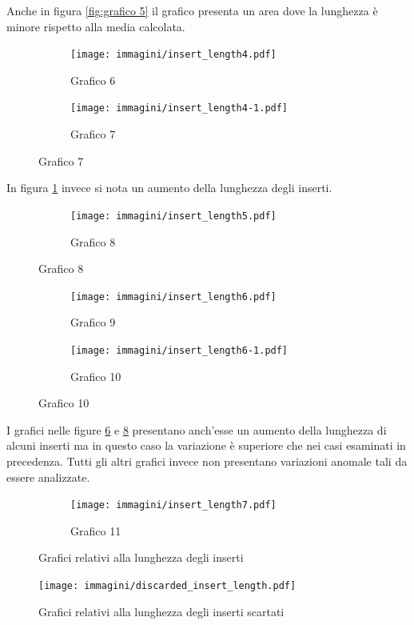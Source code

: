 Anche in figura \ref{fig:grafico 5} il grafico presenta un area dove la lunghezza è minore rispetto alla media calcolata.

\begin{figure}[htbp]
	\ContinuedFloat
	\centering
	\begin{subfigure}[b]{.45\textwidth}	
		\texttt{[image: immagini/insert\_length4.pdf]}
		\caption{Grafico 6}
		\label{fig:grafico 6}
	\end{subfigure}
	\quad
	\begin{subfigure}[b]{.45\textwidth}
		\texttt{[image: immagini/insert\_length4-1.pdf]}
		\caption{Grafico 7}
		\label{fig:grafico 7}
	\end{subfigure}
\end{figure}

In figura \ref{fig:grafico 6} invece si nota un aumento della lunghezza degli inserti.

\begin{figure}[htbp]
	\ContinuedFloat
	\centering
	\begin{subfigure}[b]{.45\textwidth}
		\texttt{[image: immagini/insert\_length5.pdf]}
		\caption{Grafico 8}
		\label{fig:grafico 8}
	\end{subfigure}
\end{figure}
\begin{figure}[htbp]
	\ContinuedFloat
	\centering
	\begin{subfigure}[b]{.45\textwidth}
		\texttt{[image: immagini/insert\_length6.pdf]}
		\caption{Grafico 9}
		\label{fig:grafico 9}
	\end{subfigure}
	\quad
	\begin{subfigure}[b]{.45\textwidth}
		\texttt{[image: immagini/insert\_length6-1.pdf]}
		\caption{Grafico 10}
		\label{fig:grafico 10}
	\end{subfigure}
\end{figure}

I grafici nelle figure \ref{fig:grafico 9} e \ref{fig:grafico 10} presentano anch'esse un aumento della lunghezza di alcuni inserti ma in questo caso la variazione è superiore che nei casi esaminati in precedenza.
Tutti gli altri grafici invece non presentano variazioni anomale tali da essere analizzate.

\begin{figure}[htbp]
	\ContinuedFloat
	\centering
	\begin{subfigure}[b]{.45\textwidth}
		\texttt{[image: immagini/insert\_length7.pdf]}
		\caption{Grafico 11}
		\label{fig:grafico 11}
	\end{subfigure}
	\caption{Grafici relativi alla lunghezza degli inserti}
\end{figure}
\begin{figure}[htbp]
	\centering
	\texttt{[image: immagini/discarded\_insert\_length.pdf]}
	\caption{Grafici relativi alla lunghezza degli inserti scartati}
	\label{fig:discarded insert length}
\end{figure}

